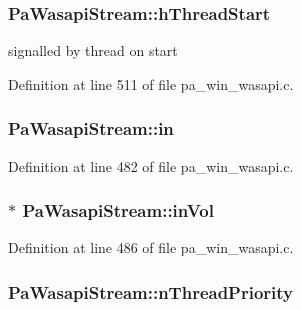 \subsubsection[{\texorpdfstring{h\+Thread\+Start}{hThreadStart}}]{ Pa\+Wasapi\+Stream\+::h\+Thread\+Start}\hypertarget{struct_pa_wasapi_stream_a868659eb654efd86e5bd0ed49c623656}{}\label{struct_pa_wasapi_stream_a868659eb654efd86e5bd0ed49c623656}


signalled by thread on start 



Definition at line 511 of file pa\+\_\+win\+\_\+wasapi.\+c.

\subsubsection[{\texorpdfstring{in}{in}}]{ Pa\+Wasapi\+Stream\+::in}\hypertarget{struct_pa_wasapi_stream_a0800ee4bf755e3ea24aa501c1ae4edc9}{}\label{struct_pa_wasapi_stream_a0800ee4bf755e3ea24aa501c1ae4edc9}


Definition at line 482 of file pa\+\_\+win\+\_\+wasapi.\+c.

\subsubsection[{\texorpdfstring{in\+Vol}{inVol}}]{$\ast$ Pa\+Wasapi\+Stream\+::in\+Vol}\hypertarget{struct_pa_wasapi_stream_a035111d1e825146eae105bd83d810397}{}\label{struct_pa_wasapi_stream_a035111d1e825146eae105bd83d810397}


Definition at line 486 of file pa\+\_\+win\+\_\+wasapi.\+c.

\subsubsection[{\texorpdfstring{n\+Thread\+Priority}{nThreadPriority}}]{ Pa\+Wasapi\+Stream\+::n\+Thread\+Priority}\hypertarget{struct_pa_wasapi_stream_a49a89c3dc97a1a541891b75f303ef7f0}{}\label{struct_pa_wasapi_stream_a49a89c3dc97a1a541891b75f303ef7f0}


